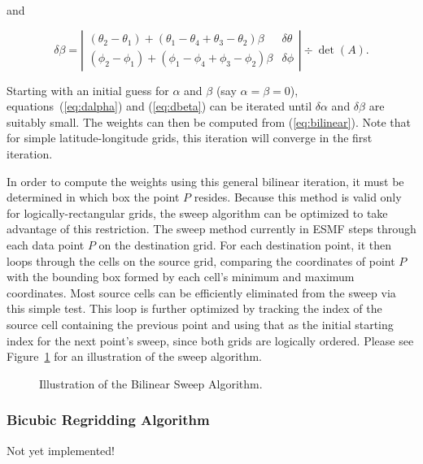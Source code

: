      and

\begin{equation}\label{eq:dbeta}
\delta\beta = \left|\begin{array}{cc}
(\theta_2-\theta_1) + (\theta_1-\theta_4+\theta_3-\theta_2)\beta &
\delta\theta \\
(\phi_2-\phi_1) + (\phi_1-\phi_4+\phi_3-\phi_2)\beta &
\delta\phi 
\end{array}\right| \div \det(A).
\end{equation}

     Starting with an initial guess for $\alpha$ and $\beta$ (say 
     $\alpha=\beta=0$), equations~(\ref{eq:dalpha}) and (\ref{eq:dbeta})
     can be iterated until $\delta\alpha$ and $\delta\beta$ are suitably small.
     The weights can then be computed from (\ref{eq:bilinear}).  Note that
     for simple latitude-longitude grids, this iteration will converge in the
     first iteration.

     In order to compute the weights using this general bilinear iteration,
     it must be determined in which box the point $P$ resides.  Because this
     method is valid only for logically-rectangular grids, the sweep algorithm
     can be optimized to take advantage of this restriction.  The sweep
     method currently in ESMF steps through each data point $P$ on the destination
     grid.  For each destination point, it then loops through the cells on the
     source grid, comparing the coordinates of point $P$ with the bounding box
     formed by each cell's minimum and maximum coordinates.  Most source cells can
     be efficiently eliminated from the sweep via this simple test.  This loop is
     further optimized by tracking the index of the source cell containing the
     previous point and using that as the initial starting index for the next
     point's sweep, since both grids are logically ordered.  Please see
     Figure~\ref{fig:BilinearSweep} for an illustration of the sweep algorithm.

\begin{center}
\begin{figure}
\caption{Illustration of the Bilinear Sweep Algorithm. }
\label{fig:BilinearSweep}

\end{figure}
\end{center}

\subsubsection{Bicubic Regridding Algorithm}  Not yet implemented!
\label{sec:BicubicRegrid}

